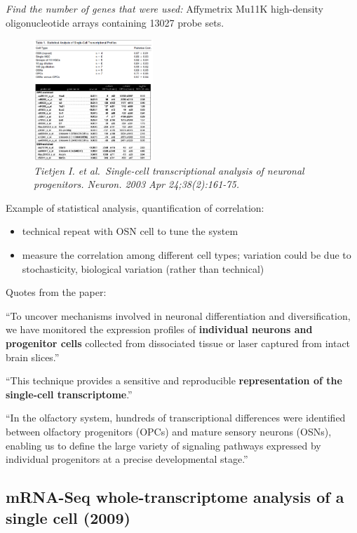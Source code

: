\emph{Find the number of genes that were used:} Affymetrix Mu11K
high-density oligonucleotide arrays containing 13027 probe sets.

\begin{figure}
\centering
\includegraphics[width=0.4\textwidth]{images/Screenshot_2023-03-15_at_11-30-24.png}
\caption{\emph{Tietjen I. et al.~Single-cell transcriptional analysis of
neuronal progenitors. Neuron. 2003 Apr 24;38(2):161-75.}}
\end{figure}

Example of statistical analysis, quantification of correlation:

\begin{itemize}
\tightlist
\item
  technical repeat with OSN cell to tune the system
\item
  measure the correlation among different cell types; variation could be
  due to stochasticity, biological variation (rather than technical)
\end{itemize}

Quotes from the paper:

``To uncover mechanisms involved in neuronal differentiation and
diversification, we have monitored the expression profiles of
\textbf{individual neurons and progenitor cells} collected from
dissociated tissue or laser captured from intact brain slices.''

``This technique provides a sensitive and reproducible
\textbf{representation of the single-cell transcriptome}.''

``In the olfactory system, hundreds of transcriptional differences were
identified between olfactory progenitors (OPCs) and mature sensory
neurons (OSNs), enabling us to define the large variety of signaling
pathways expressed by individual progenitors at a precise developmental
stage.''

\hypertarget{mrna-seq-whole-transcriptome-analysis-of-a-single-cell-2009}{%
\subsection{mRNA-Seq whole-transcriptome analysis of a single cell
(2009)}\label{mrna-seq-whole-transcriptome-analysis-of-a-single-cell-2009}}

